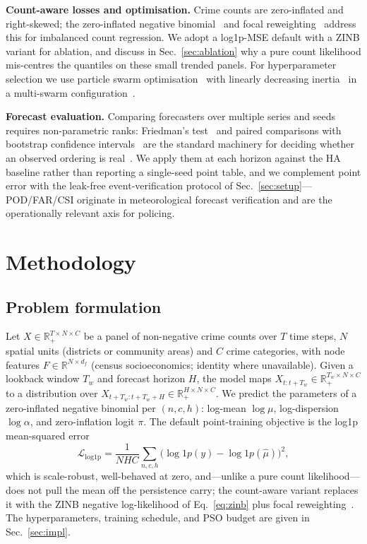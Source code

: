 \documentclass[11pt,conference]{IEEEtran}
\newcommand{\R}{\mathbb{R}}
\begin{document}
\textbf{Count-aware losses and optimisation.} Crime counts are
zero-inflated and right-skewed; the zero-inflated negative
binomial~\cite{lambert1992poisson,hilbe2011negativebinomial,yang2021zinb}
and focal reweighting~\cite{lin2017focal} address this for imbalanced count
regression. We adopt a log1p-MSE default with a ZINB variant for ablation,
and discuss in Sec.~\ref{sec:ablation} why a pure count likelihood
mis-centres the quantiles on these small trended panels. For hyperparameter
selection we use particle swarm optimisation~\cite{kennedy1995pso} with
linearly decreasing inertia~\cite{shi2001inertia} in a multi-swarm
configuration~\cite{van2013pso}.

\textbf{Forecast evaluation.} Comparing forecasters over multiple series and
seeds requires non-parametric ranks: Friedman's test~\cite{friedman1937use}
and paired comparisons with bootstrap confidence intervals~\cite{efron1993bootstrap}
are the standard machinery for deciding whether an observed ordering is
real~\cite{diebold1995comparing}. We apply them at each horizon against the HA
baseline rather than reporting a single-seed point table, and we complement
point error with the leak-free event-verification protocol of
Sec.~\ref{sec:setup}---POD/FAR/CSI originate in meteorological forecast
verification and are the operationally relevant axis for policing.

\section{Methodology}\label{sec:method}
\subsection{Problem formulation}\label{sec:formulation}
Let $X\in\R_+^{T\times N\times C}$ be a panel of non-negative crime counts over
$T$ time steps, $N$ spatial units (districts or community areas) and $C$ crime
categories, with node features $F\in\R^{N\times d_f}$ (census socioeconomics;
identity where unavailable). Given a lookback window $T_w$ and forecast horizon
$H$, the model maps $X_{t:t+T_w}\in\R_+^{T_w\times N\times C}$ to a
distribution over $X_{t+T_w:t+T_w+H}\in\R_+^{H\times N\times C}$. We predict the
parameters of a zero-inflated negative binomial per $(n,c,h)$: log-mean
$\log\mu$, log-dispersion $\log\alpha$, and zero-inflation logit $\pi$. The
default point-training objective is the log1p mean-squared error
\begin{equation}\label{eq:loss}
  \mathcal{L}_{\mathrm{log1p}}=\frac{1}{NHC}\sum_{n,c,h}\big(\log1p(y)-\log1p(\hat\mu)\big)^2,
\end{equation}
which is scale-robust, well-behaved at zero, and---unlike a pure count
likelihood---does not pull the mean off the persistence carry; the count-aware
variant replaces it with the ZINB negative log-likelihood of
Eq.~\eqref{eq:zinb} plus focal reweighting~\cite{lin2017focal}. The
hyperparameters, training schedule, and PSO budget are given in
Sec.~\ref{sec:impl}.
\end{document}
